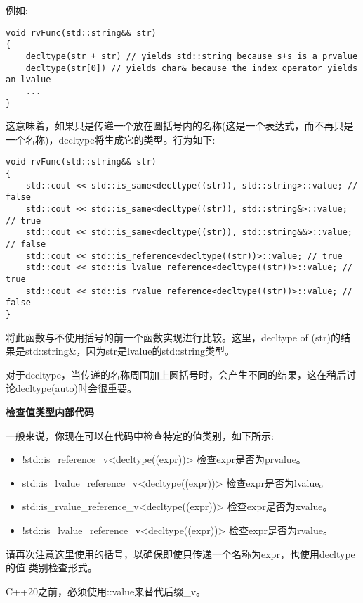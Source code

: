 例如:\par

\begin{lstlisting}[caption={}]
void rvFunc(std::string&& str)
{
	decltype(str + str) // yields std::string because s+s is a prvalue
	decltype(str[0]) // yields char& because the index operator yields an lvalue
	...
}
\end{lstlisting}

这意味着，如果只是传递一个放在圆括号内的名称(这是一个表达式，而不再只是一个名称)，decltype将生成它的类型。行为如下:\par

\begin{lstlisting}[caption={}]
void rvFunc(std::string&& str)
{
	std::cout << std::is_same<decltype((str)), std::string>::value; // false
	std::cout << std::is_same<decltype((str)), std::string&>::value; // true
	std::cout << std::is_same<decltype((str)), std::string&&>::value; // false
	std::cout << std::is_reference<decltype((str))>::value; // true
	std::cout << std::is_lvalue_reference<decltype((str))>::value; // true
	std::cout << std::is_rvalue_reference<decltype((str))>::value; // false
}
\end{lstlisting}

将此函数与不使用括号的前一个函数实现进行比较。这里，decltype of (str)的结果是std::string\&，因为str是lvalue的std::string类型。\par

对于decltype，当传递的名称周围加上圆括号时，会产生不同的结果，这在稍后讨论decltype(auto)时会很重要。\par

\hspace*{\fill} \par %
\textbf{检查值类型内部代码}

一般来说，你现在可以在代码中检查特定的值类别，如下所示:\par

\begin{itemize}
	\item !std::is\_reference\_v<decltype((expr))>
	检查expr是否为prvalue。
	\item std::is\_lvalue\_reference\_v<decltype((expr))>
	检查expr是否为lvalue。
	\item std::is\_rvalue\_reference\_v<decltype((expr))>
	检查expr是否为xvalue。
	\item !std::is\_lvalue\_reference\_v<decltype((expr))>
	检查expr是否为rvalue。
\end{itemize}

请再次注意这里使用的括号，以确保即使只传递一个名称为expr，也使用decltype的值-类别检查形式。\par

C++20之前，必须使用::value来替代后缀\_v。\par















